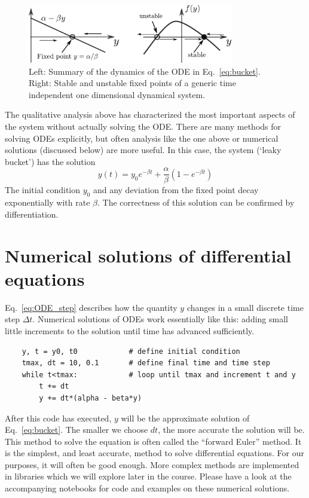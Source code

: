 \begin{figure}
    \includegraphics[width=0.8\textwidth]{figures/fixed_points.pdf}
    \caption{\label{fig:fixed_points}Left: Summary of the dynamics of the ODE in Eq.~\ref{eq:bucket}. Right: Stable and unstable fixed points of a generic time independent one dimensional dynamical system.}
\end{figure}

The qualitative analysis above has characterized the most important aspects of the system without actually solving the ODE.
There are many methods for solving ODEs explicitly, but often analysis like the one above or numerical solutions (discussed below) are more useful.
In this case, the system (`leaky bucket') has the solution
\begin{equation}
    y(t) = y_0 e^{-\beta t} + \frac{\alpha}{\beta}\left(1 - e^{-\beta t}\right)
\end{equation}
The initial condition $y_0$ and any deviation from the fixed point decay exponentially with rate $\beta$.
The correctness of this solution can be confirmed by differentiation.

\section{Numerical solutions of differential equations}
Eq.~\ref{eq:ODE_step} describes how the quantity $y$ changes in a small discrete time step $\Delta t$.
Numerical solutions of ODEs work essentially like this: adding small little increments to the solution until time has advanced sufficiently.
\begin{verbatim}
    y, t = y0, t0            # define initial condition
    tmax, dt = 10, 0.1       # define final time and time step
    while t<tmax:            # loop until tmax and increment t and y
        t += dt
        y += dt*(alpha - beta*y)
\end{verbatim}
After this code has executed, $y$ will be the approximate solution of Eq.~\ref{eq:bucket}.
The smaller we choose $dt$, the more accurate the solution will be.
This method to solve the equation is often called the ``forward Euler'' method.
It is the simplest, and least accurate, method to solve differential equations.
For our purposes, it will often be good enough.
More complex methods are implemented in libraries which we will explore later in the course.
Please have a look at the accompanying notebooks for code and examples on these numerical solutions.

